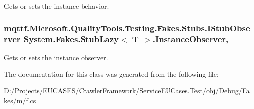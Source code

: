 Gets or sets the instance behavior.

\hypertarget{class_system_1_1_fakes_1_1_stub_lazy_3_01_t_01_4_a5947423b8616e56e1c1c77d17a659618}{
\subsubsection[{Instance\-Observer}]{\setlength{\rightskip}{0pt plus 5cm}mqttf.\-Microsoft.\-Quality\-Tools.\-Testing.\-Fakes.\-Stubs.\-I\-Stub\-Observer System.\-Fakes.\-Stub\-Lazy$<$ T $>$.Instance\-Observer\hspace{0.3cm}{\ttfamily [get]}, {\ttfamily [set]}}}\label{class_system_1_1_fakes_1_1_stub_lazy_3_01_t_01_4_a5947423b8616e56e1c1c77d17a659618}


Gets or sets the instance observer.



The documentation for this class was generated from the following file\-:\begin{DoxyCompactItemize}
\item 
D\-:/\-Projects/\-E\-U\-C\-A\-S\-E\-S/\-Crawler\-Framework/\-Service\-E\-U\-Cases.\-Test/obj/\-Debug/\-Fakes/m/\hyperlink{m_2f_8cs}{f.\-cs}\end{DoxyCompactItemize}
